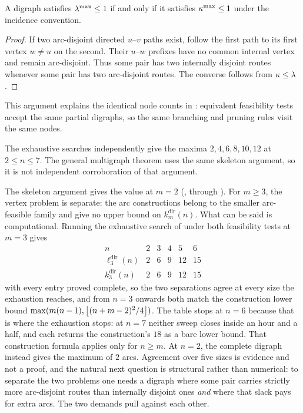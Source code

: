 \begin{lemma}[The two directed feasible families at $m=2$]\label{lem:directed-m2-families}
A digraph satisfies $\lambda^{\max}\le1$ if and only if it satisfies $\kappa^{\max}\le1$ under the incidence convention.
\end{lemma}
\begin{proof}
If two arc-disjoint directed $u$--$v$ paths exist, follow the first path to its first vertex $w\ne u$ on the second.
Their $u$--$w$ prefixes have no common internal vertex and remain arc-disjoint.
Thus some pair has two internally disjoint routes whenever some pair has two arc-disjoint routes.
The converse follows from $\kappa\le\lambda$.
\end{proof}
This argument explains the identical node counts in : equivalent feasibility tests accept the same partial digraphs, so the same branching and pruning rules visit the same nodes.


The exhaustive searches independently give the maxima $2,4,6,8,10,12$ at $2\le n\le7$.
The general multigraph theorem uses the same skeleton argument, so it is not independent corroboration of that argument.

\begin{remark}\label{rem:dir-vertex-m3}
The skeleton argument gives the value at $m=2$ (, through ). For $m\ge3$, the vertex problem is separate: the arc constructions belong to the smaller arc-feasible family and give no upper bound on $k_m^{\mathrm{dir}}(n)$. What can be said is computational. Running the exhaustive search of  under both feasibility tests at $m = 3$ gives
\[
\begin{array}{r|ccccc}
    n & 2 & 3 & 4 & 5 & 6 \\ \hline
    \ell_3^{\mathrm{dir}}(n) & 2 & 6 & 9 & 12 & 15 \\
    k_3^{\mathrm{dir}}(n)    & 2 & 6 & 9 & 12 & 15
\end{array}
\]
with every entry proved complete, so the two separations agree at every size the exhaustion reaches, and from $n = 3$ onwards both match the construction lower bound $\max(m(n-1), \left\lfloor (n+m-2)^2/4 \right\rfloor)$. The table stops at $n = 6$ because that is where the exhaustion stops: at $n = 7$ neither sweep closes inside an hour and a half, and each returns the construction's $18$ as a bare lower bound. That construction formula applies only for $n\ge m$. At $n=2$, the complete digraph instead gives the maximum of $2$ arcs. Agreement over five sizes is evidence and not a proof, and the natural next question is structural rather than numerical: to separate the two problems one needs a digraph where some pair carries strictly more arc-disjoint routes than internally disjoint ones \emph{and} where that slack pays for extra arcs. The two demands pull against each other.
\end{remark}

